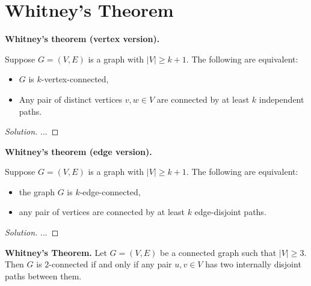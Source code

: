 
\section{Whitney's Theorem}

\begin{theorem}
\textbf{Whitney's theorem (vertex version).}
{\rm
Suppose $G=(V,E)$ is a graph with $|V|\geq k+1$. The following are
equivalent:
\begin{itemize}
\item
$G$ is $k$-vertex-connected,
\item
Any pair of distinct vertices $v,w\in V$ are connected by
at least $k$ independent paths.
\end{itemize}
}
\end{theorem}

\begin{proof}[Solution]

...

\end{proof}



\begin{theorem}
\textbf{Whitney's theorem (edge version).}
{\rm
Suppose $G=(V,E)$ is a graph with $|V|\geq k+1$. The following are
equivalent:
\begin{itemize}
\item
the graph $G$ is $k$-edge-connected,

\item
any pair of
vertices are connected by at least $k$ edge-disjoint paths.
\end{itemize}
}
\end{theorem}

\begin{proof}[Solution]

...

\end{proof}


\begin{theorem}
\textbf{Whitney's Theorem.}
Let $G = (V, E)$ be a connected graph such that $|V| \geq 3$. Then $G$
is $2$-connected if and only if any pair $u,v \in V$ has two
internally disjoint paths between them.
\end{theorem}



